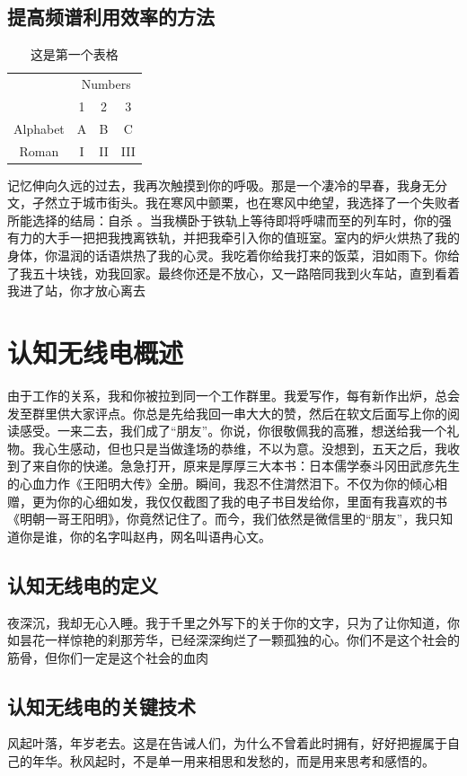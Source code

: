 \subsection{提高频谱利用效率的方法}
\begin{table}
    \centering
    \caption{这是第一个表格}
    \begin{tabular}{cccc}
        \toprule
        & \multicolumn{3}{c}{Numbers} \\
        \cmidrule{2-4}
        & 1 & 2 & 3 \\
        \midrule
        Alphabet & A & B & C \footnotemark \\
        Roman & I & II& III \\
    \bottomrule
    \end{tabular}
    
\end{table}
记忆伸向久远的过去，我再次触摸到你的呼吸。那是一个凄冷的早春，我身无分文，孑然立于城市街头。我在寒风中颤栗，也在寒风中绝望，我选择了一个失败者所能选择的结局：自杀 。当我横卧于铁轨上等待即将呼啸而至的列车时，你的强有力的大手一把把我拽离铁轨，并把我牵引入你的值班室。室内的炉火烘热了我的身体，你温润的话语烘热了我的心灵。我吃着你给我打来的饭菜，泪如雨下。你给了我五十块钱，劝我回家。最终你还是不放心，又一路陪同我到火车站，直到看着我进了站，你才放心离去
\section{认知无线电概述}
由于工作的关系，我和你被拉到同一个工作群里。我爱写作，每有新作出炉，总会发至群里供大家评点。你总是先给我回一串大大的赞，然后在软文后面写上你的阅读感受。一来二去，我们成了“朋友”。你说，你很敬佩我的高雅，想送给我一个礼物。我心生感动，但也只是当做逢场的恭维，不以为意。没想到，五天之后，我收到了来自你的快递。急急打开，原来是厚厚三大本书：日本儒学泰斗冈田武彦先生的心血力作《王阳明大传》全册。瞬间，我忍不住潸然泪下。不仅为你的倾心相赠，更为你的心细如发，我仅仅截图了我的电子书目发给你，里面有我喜欢的书《明朝一哥王阳明》，你竟然记住了。而今，我们依然是微信里的“朋友”，我只知道你是谁，你的名字叫赵冉，网名叫语冉心文。
\subsection{认知无线电的定义}
夜深沉，我却无心入睡。我于千里之外写下的关于你的文字，只为了让你知道，你如昙花一样惊艳的刹那芳华，已经深深绚烂了一颗孤独的心。你们不是这个社会的筋骨，但你们一定是这个社会的血肉
\subsection{认知无线电的关键技术}
风起叶落，年岁老去。这是在告诫人们，为什么不曾着此时拥有，好好把握属于自己的年华。秋风起时，不是单一用来相思和发愁的，而是用来思考和感悟的。



